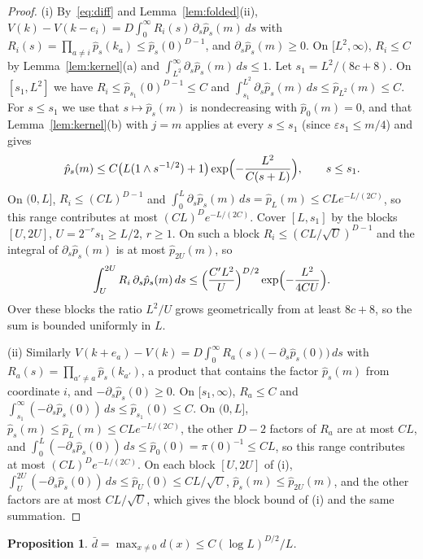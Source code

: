 \documentclass[11pt]{amsart}
\newtheorem{proposition}[theorem]{Proposition}
\theoremstyle{remark}
\newcommand{\eps}{\varepsilon}
\begin{document}
\begin{proof}
(i) By~\eqref{eq:diff} and Lemma~\ref{lem:folded}(ii),
$V(k)-V(k-e_i)=D\int_0^\infty R_i(s)\,\partial_s\hat p_s(m)\,ds$ with $R_i(s)=\prod_{a\ne i}\hat p_s(k_a)\le\hat
p_s(0)^{D-1}$, and $\partial_s\hat p_s(m)\ge0$. On $[L^2,\infty)$, $R_i\le C$ by Lemma~\ref{lem:kernel}(a) and
$\int_{L^2}^\infty\partial_s\hat p_s(m)\,ds\le1$. Let $s_1=L^2/(8c+8)$. On $[s_1,L^2]$ we have
$R_i\le\hat p_{s_1}(0)^{D-1}\le C$ and $\int_{s_1}^{L^2}\partial_s\hat p_s(m)\,ds\le\hat p_{L^2}(m)\le C$. For $s\le
s_1$ we use that $s\mapsto\hat p_s(m)$ is nondecreasing with $\hat p_0(m)=0$, and that Lemma~\ref{lem:kernel}(b) with
$j=m$ applies at every $s\le s_1$ (since $\eps s_1\le m/4$) and gives
\begin{equation}\label{eq:pm}
\hat p_s(m)\le C\bigl(L(1\wedge s^{-1/2})+1\bigr)\exp\Bigl(-\frac{L^2}{C(s+L)}\Bigr),\qquad s\le s_1.
\end{equation}
On $(0,L]$, $R_i\le(CL)^{D-1}$ and $\int_0^L\partial_s\hat p_s(m)\,ds=\hat p_L(m)\le CLe^{-L/(2C)}$, so this range
contributes at most $(CL)^De^{-L/(2C)}$. Cover $[L,s_1]$ by the blocks $[U,2U]$, $U=2^{-r}s_1\ge L/2$, $r\ge1$. On such a block $R_i\le(C L/\sqrt U)^{D-1}$ and the
integral of $\partial_s\hat p_s(m)$ is at most $\hat p_{2U}(m)$, so
\[
\int_U^{2U}R_i\,\partial_s\hat p_s(m)\,ds\le\Bigl(\frac{C'L^2}{U}\Bigr)^{D/2}\exp\Bigl(-\frac{L^2}{4CU}\Bigr).
\]
Over these blocks the ratio $L^2/U$ grows geometrically from at least $8c+8$, so
the sum is bounded uniformly in $L$.

(ii) Similarly $V(k+e_a)-V(k)=D\int_0^\infty R_a(s)\bigl(-\partial_s\hat p_s(0)\bigr)\,ds$ with
$R_a(s)=\prod_{a'\ne a}\hat p_s(k_{a'})$, a product that contains the factor $\hat p_s(m)$ from coordinate $i$, and
$-\partial_s\hat p_s(0)\ge0$. On $[s_1,\infty)$, $R_a\le C$ and $\int_{s_1}^\infty(-\partial_s\hat p_s(0))\,ds\le\hat
p_{s_1}(0)\le C$. On $(0,L]$, $\hat p_s(m)\le\hat p_L(m)\le CLe^{-L/(2C)}$, the other $D-2$ factors of $R_a$ are at most
$CL$, and $\int_0^L(-\partial_s\hat p_s(0))\,ds\le\hat p_0(0)=\pi(0)^{-1}\le CL$, so this range contributes at most
$(CL)^De^{-L/(2C)}$. On each block $[U,2U]$ of (i), $\int_U^{2U}(-\partial_s\hat p_s(0))\,ds\le\hat p_U(0)\le
CL/\sqrt U$, $\hat p_s(m)\le\hat p_{2U}(m)$, and the other factors are at most $CL/\sqrt U$, which gives the block bound
of (i) and the same summation.
\end{proof}

\begin{proposition}\label{prop:deficit}
$\bar d=\max_{x\ne0}d(x)\le C(\log L)^{D/2}/L$.
\end{proposition}
\end{document}
